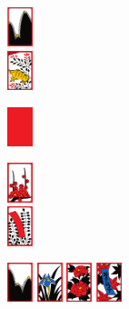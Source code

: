 \begin{frame}[fragile]
\begin{center}
    \parbox{\textwidth}{
      \centering
      \parbox{2em}{
        \includegraphics[width=2em]{images/cards/J011}\\
        \includegraphics[width=2em]{images/cards/A07}%
        \hspace*{-1.5em}%
      }
      \quad
      \parbox{2em}{%
        \vspace*{0em}%
        \includegraphics[width=2em]{images/cards/hidden}
      }
      \quad
      \parbox{2em}{
        \includegraphics[width=2em]{images/cards/J020}\\
        \includegraphics[width=2em]{images/cards/R04}
      }
    }

    \vspace*{1.5em}

    \parbox{\textwidth}{
      \centering
      \includegraphics[width=2em]{images/cards/J010}
      \includegraphics[width=2em]{images/cards/J050}
      \includegraphics[width=2em]{images/cards/J060}
      \includegraphics[width=2em]{images/cards/R10}
    }
  \end{center}
\end{frame}

